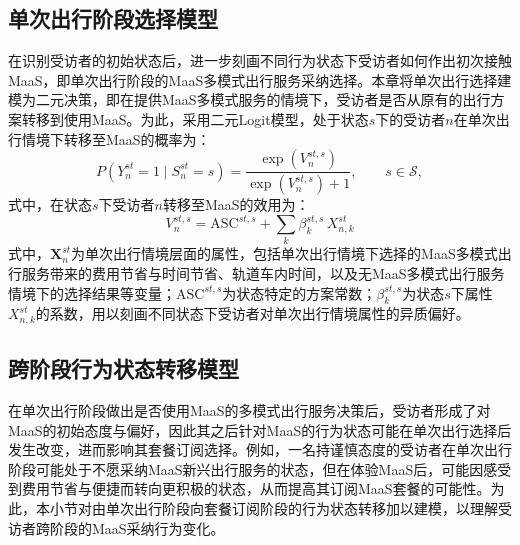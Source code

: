 \subsection{单次出行阶段选择模型}\label{subsec.int.choice1}

在识别受访者的初始状态后，进一步刻画不同行为状态下受访者如何作出初次接触MaaS，即单次出行阶段的MaaS多模式出行服务采纳选择。本章将单次出行选择建模为二元决策，即在提供MaaS多模式服务的情境下，受访者是否从原有的出行方案转移到使用MaaS。为此，采用二元Logit模型，处于状态$s$下的受访者$n$在单次出行情境下转移至MaaS的概率为：
\begin{equation}\label{eq.int.choice1}
P\!\left(Y_{n}^{st}=1\mid S_n^{st}=s\right)=\frac{\exp\!\left(V_{n}^{st,s}\right)}{\exp\!\left(V_{n}^{st,s}\right)+1},\qquad s\in\mathcal{S},
\end{equation}
式中，在状态$s$下受访者$n$转移至MaaS的效用为：
\begin{equation}\label{eq.int.choice1V}
V_{n}^{st,s}=\mathrm{ASC}^{st,s}+\sum_{k}\beta_{k}^{st,s}\, X_{n,k}^{st}
\end{equation}
式中，$\boldsymbol{X}_{n}^{st}$为单次出行情境层面的属性，包括单次出行情境下选择的MaaS多模式出行服务带来的费用节省与时间节省、轨道车内时间，以及无MaaS多模式出行服务情境下的选择结果等变量；$\mathrm{ASC}^{st,s}$为状态特定的方案常数；$\beta_{k}^{st,s}$为状态$s$下属性$X_{n,k}^{st}$的系数，用以刻画不同状态下受访者对单次出行情境属性的异质偏好。

\subsection{跨阶段行为状态转移模型}\label{subsec.int.trans}

在单次出行阶段做出是否使用MaaS的多模式出行服务决策后，受访者形成了对MaaS的初始态度与偏好，因此其之后针对MaaS的行为状态可能在单次出行选择后发生改变，进而影响其套餐订阅选择。例如，一名持谨慎态度的受访者在单次出行阶段可能处于不愿采纳MaaS新兴出行服务的状态，但在体验MaaS后，可能因感受到费用节省与便捷而转向更积极的状态，从而提高其订阅MaaS套餐的可能性。为此，本小节对由单次出行阶段向套餐订阅阶段的行为状态转移加以建模，以理解受访者跨阶段的MaaS采纳行为变化。

